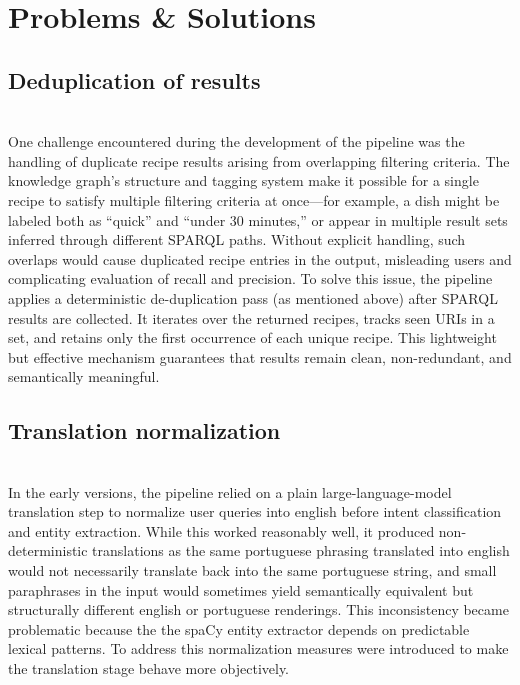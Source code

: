 \documentclass[conference]{IEEEtran}
\begin{document}
\section{Problems \& Solutions}

\subsection{Deduplication of results}
\noindent
\\
One challenge encountered during the development of the pipeline was the handling of duplicate recipe results arising from overlapping filtering criteria.
The knowledge graph’s structure and tagging system make it possible for a single recipe to satisfy multiple filtering criteria at once—for example, a dish might be labeled both as “quick” and “under 30 minutes,” or appear in multiple result sets inferred through different SPARQL paths. Without explicit handling, such overlaps would cause duplicated recipe entries in the output, misleading users and complicating evaluation of recall and precision. To solve this issue, the pipeline applies a deterministic de-duplication pass (as mentioned above) after SPARQL results are collected. It iterates over the returned recipes, tracks seen URIs in a set, and retains only the first occurrence of each unique recipe. This lightweight but effective mechanism guarantees that results remain clean, non-redundant, and semantically meaningful.


\subsection{Translation normalization}
\noindent
\\
In the early versions, the pipeline relied on a plain large-language-model translation step to normalize user queries into english before intent classification and entity extraction. While this worked reasonably well, it produced non-deterministic translations as the same portuguese phrasing translated into english would not necessarily translate back into the same portuguese string, and small paraphrases in the input would sometimes yield semantically equivalent but structurally different english or portuguese renderings. This inconsistency became problematic because the the spaCy entity extractor depends on predictable lexical patterns. To address this normalization measures were introduced to make the translation stage behave more objectively. 
\end{document}
